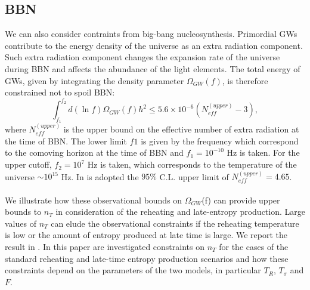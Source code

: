 \documentclass[11pt,a4paper,twoside]{book}
\begin{document}
\subsection*{BBN}
We can also consider contraints from big-bang nucleosynthesis. Primordial GWs contribute to the energy density of the universe as an extra radiation component. Such extra radiation component changes the expansion rate of the universe during BBN and affects the abundance of the light elements. The total energy of GWs, given by integrating the density  parameter  $ \Omega_{GW}(f) $, is therefore constrained not to spoil BBN:
\begin{equation}
	\label{Chap3:ConstraintsBBN}
	\int_{f_1}^{f_2} d(\ln f)\Omega_{GW}(f)h^{2} \le 5.6 \times 10^{-6}(N^{(upper)}_{eff} - 3),
\end{equation}
where $ N^{(upper)}_{eff} $ is the upper bound on the effective number of extra radiation at the time of BBN. The lower limit $ f1 $ is given by the frequency which correspond to the comoving horizon at the time of BBN and $ f_{1}=10^{-10} $ Hz is taken. For the upper cutoff, $ f_{2}=10^{7} $ Hz is taken, which corresponds to the temperature of the universe $ \sim 10^{15} $ Hz. In \cite{Chap3:BlueTiltedSpectrum} is adopted the $ 95 \% $ C.L. upper limit of $ N^{(upper)}_{eff} = 4.65 $.\\
\\
We illustrate how these observational bounds on $\Omega_{GW}$(f) can provide upper bounds to $ n_{T} $ in consideration of the reheating and late-entropy production. Large values of $ n_{T} $ can elude the observational constraints if the reheating temperature is low or the amount of entropy produced at late time is large. We report the result in \cite{Chap3:BlueTiltedSpectrum}. In this paper are investigated constraints on $ n_{T} $ for the cases of the standard reheating and late-time entropy production scenarios and how these constraints depend on the parameters of the two models, in particular $ T_{R} $, $ T_{\sigma} $ and $ F $.
\end{document}

